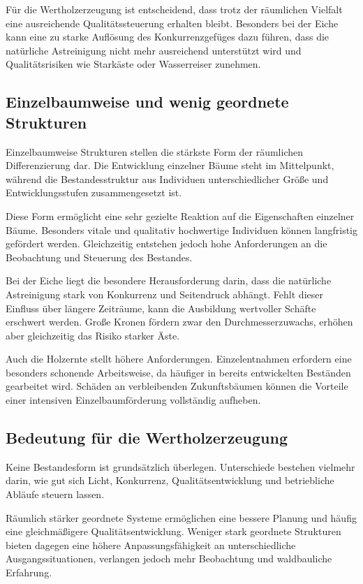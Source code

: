 \documentclass[twocolumn, bibliography=totoc, abstract=true]{scrartcl}
\begin{document}
Für die Wertholzerzeugung ist entscheidend, dass trotz der räumlichen Vielfalt eine ausreichende Qualitätssteuerung erhalten bleibt. Besonders bei der Eiche kann eine zu starke Auflösung des Konkurrenzgefüges dazu führen, dass die natürliche Astreinigung nicht mehr ausreichend unterstützt wird und Qualitätsrisiken wie Starkäste oder Wasserreiser zunehmen.

\subsection{Einzelbaumweise und wenig geordnete Strukturen}

Einzelbaumweise Strukturen stellen die stärkste Form der räumlichen Differenzierung dar. Die Entwicklung einzelner Bäume steht im Mittelpunkt, während die Bestandesstruktur aus Individuen unterschiedlicher Größe und Entwicklungsstufen zusammengesetzt ist.

Diese Form ermöglicht eine sehr gezielte Reaktion auf die Eigenschaften einzelner Bäume. Besonders vitale und qualitativ hochwertige Individuen können langfristig gefördert werden. Gleichzeitig entstehen jedoch hohe Anforderungen an die Beobachtung und Steuerung des Bestandes.

Bei der Eiche liegt die besondere Herausforderung darin, dass die natürliche Astreinigung stark von Konkurrenz und Seitendruck abhängt. Fehlt dieser Einfluss über längere Zeiträume, kann die Ausbildung wertvoller Schäfte erschwert werden. Große Kronen fördern zwar den Durchmesserzuwachs, erhöhen aber gleichzeitig das Risiko starker Äste.

Auch die Holzernte stellt höhere Anforderungen. Einzelentnahmen erfordern eine besonders schonende Arbeitsweise, da häufiger in bereits entwickelten Beständen gearbeitet wird. Schäden an verbleibenden Zukunftsbäumen können die Vorteile einer intensiven Einzelbaumförderung vollständig aufheben.

\subsection{Bedeutung für die Wertholzerzeugung}

Keine Bestandesform ist grundsätzlich überlegen. Unterschiede bestehen vielmehr darin, wie gut sich Licht, Konkurrenz, Qualitätsentwicklung und betriebliche Abläufe steuern lassen.

Räumlich stärker geordnete Systeme ermöglichen eine bessere Planung und häufig eine gleichmäßigere Qualitätsentwicklung. Weniger stark geordnete Strukturen bieten dagegen eine höhere Anpassungsfähigkeit an unterschiedliche Ausgangssituationen, verlangen jedoch mehr Beobachtung und waldbauliche Erfahrung.
\end{document}
